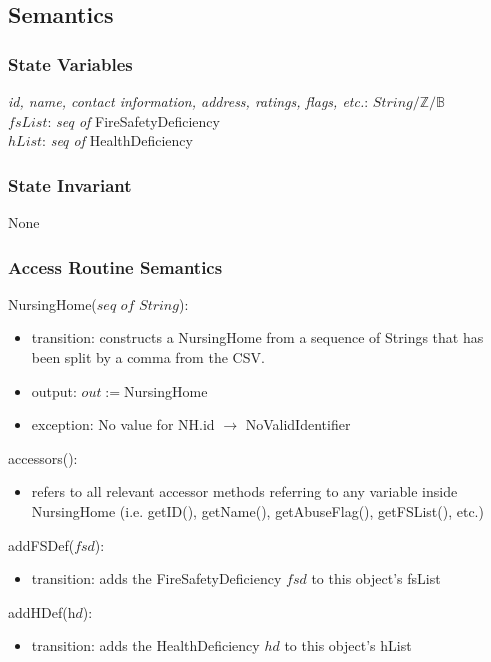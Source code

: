 \documentclass[12pt]{article}
\begin{document}
\subsection* {Semantics}

\subsubsection* {State Variables}
\textit{id, name, contact information, address, ratings, flags, etc.}: $String/\mathbb{Z}/\mathbb{B}$\\
$fsList$: \textit{seq of} FireSafetyDeficiency\\
$hList$: \textit{seq of} HealthDeficiency

\subsubsection* {State Invariant}

None

\subsubsection* {Access Routine Semantics}

NursingHome($\textit{seq of String}$):
\begin{itemize}
\item transition: constructs a NursingHome from a sequence of Strings that has been split by a comma from the CSV.
\item output: $out := $NursingHome
\item exception: No value for NH.id $\rightarrow$ NoValidIdentifier
\end{itemize}

\noindent accessors():
\begin{itemize}
\item refers to all relevant accessor methods referring to any variable inside NursingHome (i.e. getID(), getName(), getAbuseFlag(), getFSList(), etc.)
\end{itemize}

\noindent addFSDef($\textit{fsd}$):
\begin{itemize}
\item transition: adds the FireSafetyDeficiency $fsd$ to this object's fsList
\end{itemize}

\noindent addHDef($\textit{hd}$):
\begin{itemize}
\item transition: adds the HealthDeficiency $hd$ to this object's hList
\end{itemize}
\end{document}
